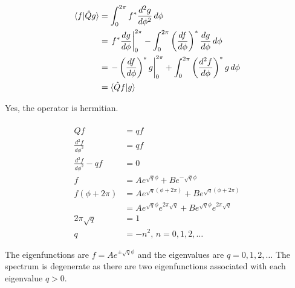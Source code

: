 \documentclass{article}
\begin{document}
\subsection{}

\begin{align*}
  \braket{f | \hat{Q} g} & = \int_0^{2 \pi} f^* \frac{d^2 g}{d \phi^2} \,d \phi                                                                                \\
                         & = \left. f^* \frac{d g}{d \phi} \right|_0^{2 \pi} - \int_0^{2 \pi} \left( \frac{d f}{d \phi} \right)^* \frac{d g}{d \phi} \,d \phi  \\
                         & = \left. -\left( \frac{d f}{d \phi} \right)^* g \right|_0^{2 \pi} + \int_0^{2 \pi} \left( \frac{d^2 f}{d \phi} \right)^* g \,d \phi \\
                         & = \braket{\hat{Q} f | g}
\end{align*}

Yes, the operator is hermitian.

\begin{align*}
  \hat{Q} f                    & = q f                                                                             \\
  \frac{d^2 f}{d \phi^2}       & = q f                                                                             \\
  \frac{d^2 f}{d \phi^2} - q f & = 0                                                                               \\
  f                            & = A e^{\sqrt{q} \phi} + B e^{-\sqrt{q} \phi}                                      \\
  f(\phi + 2 \pi)              & = A e^{\sqrt{q} (\phi + 2 \pi)} + B e^{\sqrt{q} (\phi + 2 \pi)}                   \\
                               & = A e^{\sqrt{q} \phi} e^{2 \pi \sqrt{q}} + B e^{\sqrt{q} \phi} e^{2 \pi \sqrt{q}} \\
  2 \pi \sqrt{q}               & = 1                                                                               \\
  q                            & = -n^2, \,n = 0, 1, 2, \ldots
\end{align*}

The eigenfunctions are $f = A e^{\pm \sqrt{q} \phi}$ and the eigenvalues are $q = 0, 1, 2, \ldots$ The spectrum is degenerate as there are two eigenfunctions associated with each eigenvalue $q > 0$.
\end{document}
